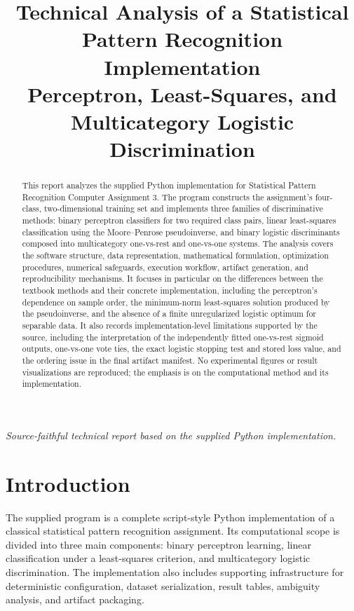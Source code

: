 \documentclass[11pt,a4paper]{article}
\title{Technical Analysis of a Statistical Pattern Recognition Implementation\\
\large Perceptron, Least-Squares, and Multicategory Logistic Discrimination}
\author{}
\date{}
\begin{document}
\maketitle
\thispagestyle{empty}
\vfill
\begin{center}
\textit{Source-faithful technical report based on the supplied Python implementation.}
\end{center}
\vfill
\newpage
\tableofcontents
\newpage

\begin{abstract}
This report analyzes the supplied Python implementation for Statistical Pattern Recognition Computer Assignment 3. The program constructs the assignment's four-class, two-dimensional training set and implements three families of discriminative methods: binary perceptron classifiers for two required class pairs, linear least-squares classification using the Moore--Penrose pseudoinverse, and binary logistic discriminants composed into multicategory one-vs-rest and one-vs-one systems. The analysis covers the software structure, data representation, mathematical formulation, optimization procedures, numerical safeguards, execution workflow, artifact generation, and reproducibility mechanisms. It focuses in particular on the differences between the textbook methods and their concrete implementation, including the perceptron's dependence on sample order, the minimum-norm least-squares solution produced by the pseudoinverse, and the absence of a finite unregularized logistic optimum for separable data. It also records implementation-level limitations supported by the source, including the interpretation of the independently fitted one-vs-rest sigmoid outputs, one-vs-one vote ties, the exact logistic stopping test and stored loss value, and the ordering issue in the final artifact manifest. No experimental figures or result visualizations are reproduced; the emphasis is on the computational method and its implementation.
\end{abstract}

\section{Introduction}
The supplied program is a complete script-style Python implementation of a classical statistical pattern recognition assignment. Its computational scope is divided into three main components: binary perceptron learning, linear classification under a least-squares criterion, and multicategory logistic discrimination. The implementation also includes supporting infrastructure for deterministic configuration, dataset serialization, result tables, ambiguity analysis, and artifact packaging.
\end{document}

